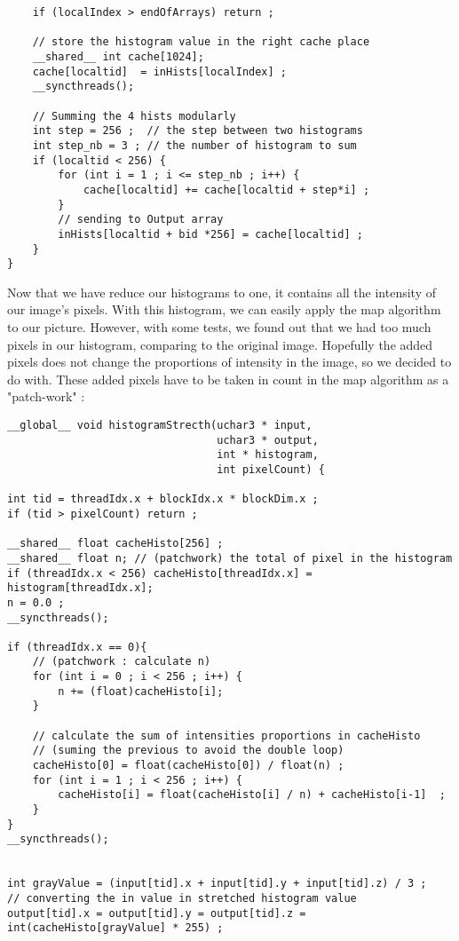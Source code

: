 \documentclass{article}
\begin{document}
\begin{enumerate}
\begin{itemize}
\begin{verbatim}
    if (localIndex > endOfArrays) return ;
    
    // store the histogram value in the right cache place 
    __shared__ int cache[1024];
    cache[localtid]  = inHists[localIndex] ;
    __syncthreads();
    
    // Summing the 4 hists modularly
    int step = 256 ;  // the step between two histograms 
    int step_nb = 3 ; // the number of histogram to sum
    if (localtid < 256)	{
        for (int i = 1 ; i <= step_nb ; i++) {
            cache[localtid] += cache[localtid + step*i] ;
        }
        // sending to Output array
        inHists[localtid + bid *256] = cache[localtid] ;
    }
}
        \end{verbatim}
    
    \end{itemize}
    
    Now that we have reduce our histograms to one, it contains all the intensity of our image's pixels. With this histogram, we can easily apply the map algorithm to our picture. However, with some tests, we found out that we had too much pixels in our histogram, comparing to the original image. Hopefully the added pixels does not change the proportions of intensity in the image, so we decided to do with. These added pixels have to be taken in count in the map algorithm as a "patch-work" : 
    
    \begin{verbatim}
__global__ void histogramStrecth(uchar3 * input, 
                                 uchar3 * output, 
                                 int * histogram, 
                                 int pixelCount) {

int tid = threadIdx.x + blockIdx.x * blockDim.x ; 
if (tid > pixelCount) return ;

__shared__ float cacheHisto[256] ; 
__shared__ float n; // (patchwork) the total of pixel in the histogram 
if (threadIdx.x < 256) cacheHisto[threadIdx.x] = histogram[threadIdx.x]; 
n = 0.0 ;
__syncthreads();

if (threadIdx.x == 0){
    // (patchwork : calculate n)
    for (int i = 0 ; i < 256 ; i++) {
        n += (float)cacheHisto[i];
    }
	
    // calculate the sum of intensities proportions in cacheHisto 
    // (suming the previous to avoid the double loop)
    cacheHisto[0] = float(cacheHisto[0]) / float(n) ;
    for (int i = 1 ; i < 256 ; i++) {
        cacheHisto[i] = float(cacheHisto[i] / n) + cacheHisto[i-1]	;
    }
}
__syncthreads();


int grayValue = (input[tid].x + input[tid].y + input[tid].z) / 3 ;
// converting the in value in stretched histogram value	
output[tid].x = output[tid].y = output[tid].z = int(cacheHisto[grayValue] * 255) ;
    \end{verbatim}
    \end{enumerate}
\end{document}
